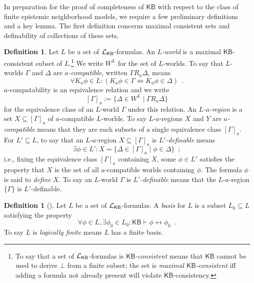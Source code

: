 \documentclass[12pt]{article}
\newcommand{\XXXcomment}[1]{}
\newcommand{\XXXcomment}[1]{\marginpar{\color{blue}{\footnotesize #1}}}
\theoremstyle{definition}
\newtheorem{definition}[theorem]{Definition}
\newcommand{\Lang}{{\cal L}}   %
\newcommand{\KB}{{\mathsf{KB}}}                        %
\begin{document}
In preparation for the proof of completeness of $\KB$ with respect to
the class of finite epistemic neighborhood models, we require
a few preliminary definitions and a key lemma.  The first definition concerns maximal
consistent sets and definability of collections of these sets.

\XXXcomment{BR: $L'$-definability was not right.  I corrected it.}

\begin{definition}
  \label{definition:definability}
  Let $L$ be a set of $\Lang_\KB$-formulas.
  An \emph{$L$-world} is a maximal $\KB$-consistent subset of $L$.\footnote{To say 
  that a set of $\Lang_\KB$-formulas is \emph{$\KB$-consistent}
  means that $\KB$ cannot be used to derive $\bot$ from a finite subset; the set is 
  \emph{maximal $\KB$-consistent}
  iff adding a formula not already present will violate $\KB$-consistency.}
  We write $W^L$ for the set of $L$-worlds.
  To say that $L$-worlds $\Gamma$ and $\Delta$ are \emph{$a$-compatible}, written
  $\Gamma R_a\Delta$, means
  \[
  \forall K_a\phi\in L:(K_a\phi\in\Gamma \Leftrightarrow K_a\phi\in\Delta)\enspace.
  \]
  $a$-compatability is an equivalence relation and we write
  \[
  [\Gamma]_a := \{\Delta\in W^L\mid \Gamma R_a\Delta\}
  \]
  for the equivalence class of an $L$-world $\Gamma$ under this relation.
  An \emph{$L$-$a$-region} is a set $X\subseteq[\Gamma]_a$
  of $a$-compatible $L$-worlds.
  To say $L$-$a$-regions $X$ and $Y$ are \emph{$a$-compatible} means
  that they are each subsets of a single equivalence class $[\Gamma]_a$.
  For $L'\subseteq L$, to say that an $L$-$a$-region $X\subseteq[\Gamma]_a$ is \emph{$L'$-definable}
  means
  \[
  \textstyle
  \exists\phi\in L':
  X=\{\Delta\in[\Gamma]_a\mid \phi\in\Delta\}\enspace;
  \]
  i.e., fixing the equivalence class $[\Gamma]_a$ containing $X$, some
  $\phi\in L'$ satisfies the property that $X$ is the set of all
  $a$-compatible worlds containing $\phi$.  The formula $\phi$ is said
  to \emph{define} $X$.  To say an $L$-world $\Gamma$ is
  \emph{$L'$-definable} means that the $L$-$a$-region $\{\Gamma\}$ is
  $L'$-definable.
\end{definition}

\begin{definition}[\cite{Segerberg1971:qpiams}]
  Let $L$ be a  set of $\Lang_\KB$-formulas.
  A \emph{basis} for $L$ is a subset $L_0\subseteq L$ satisfying the property
  \[
  \forall \phi\in L,\exists \phi_0\in L_0:
  \KB\vdash\phi\leftrightarrow\phi_0\enspace.
  \]
  To say $L$ is \emph{logically finite} means $L$ has a finite basis.
\end{definition}
\end{document}
